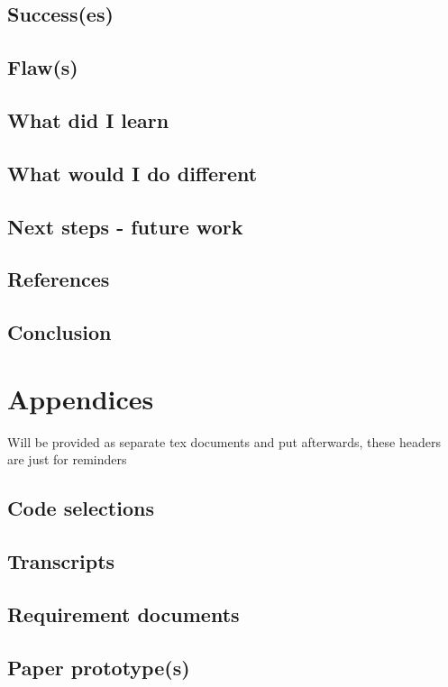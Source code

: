 \documentclass[]{report}
\begin{document}
\section{Success(es)}

\section{Flaw(s)}

\section{What did I learn}

\section{What would I do different}

\section{Next steps - future work}

\section{References}

{}



\section{Conclusion}

\chapter{Appendices}

Will be provided as separate tex documents and put afterwards, these headers are
just for reminders

\section{Code selections}

\section{Transcripts}

\section{Requirement documents}

\section{Paper prototype(s)}
\end{document}
